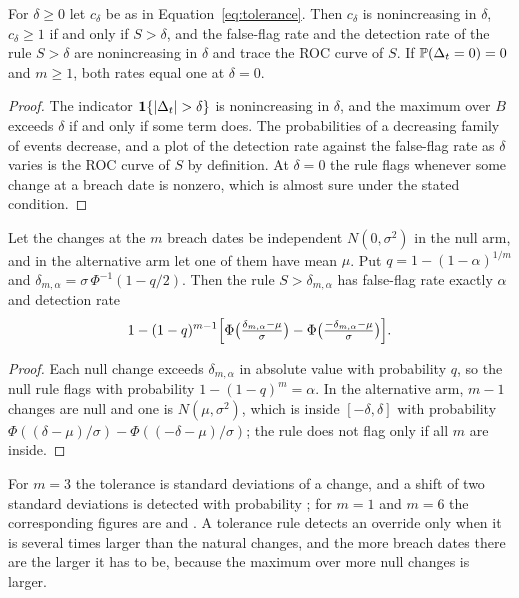 \begin{proposition}
\label{prop:tolerance}
For $\delta\ge 0$ let $c_\delta$ be as in Equation~\eqref{eq:tolerance}. Then $c_\delta$ is nonincreasing in $\delta$, $c_\delta\ge 1$ if and only if $S>\delta$, and the false-flag rate and the detection rate of the rule $S>\delta$ are nonincreasing in $\delta$ and trace the ROC curve of $S$. If $\mathbb{P}(\Delta_t=0)=0$ and $m\ge 1$, both rates equal one at $\delta=0$.
\end{proposition}
\begin{proof}
The indicator $\indic\{|\Delta_t|>\delta\}$ is nonincreasing in $\delta$, and the maximum over $B$ exceeds $\delta$ if and only if some term does. The probabilities of a decreasing family of events decrease, and a plot of the detection rate against the false-flag rate as $\delta$ varies is the ROC curve of $S$ by definition. At $\delta=0$ the rule flags whenever some change at a breach date is nonzero, which is almost sure under the stated condition.
\end{proof}

\begin{proposition}
\label{prop:gaussian}
Let the changes at the $m$ breach dates be independent $N(0,\sigma^2)$ in the null arm, and in the alternative arm let one of them have mean $\mu$. Put $q=1-(1-\alpha)^{1/m}$ and $\delta_{m,\alpha}=\sigma\,\Phi^{-1}(1-q/2)$. Then the rule $S>\delta_{m,\alpha}$ has false-flag rate exactly $\alpha$ and detection rate
\begin{equation}
1-(1-q)^{m-1}\Bigl[\Phi\bigl(\tfrac{\delta_{m,\alpha}-\mu}{\sigma}\bigr)-\Phi\bigl(\tfrac{-\delta_{m,\alpha}-\mu}{\sigma}\bigr)\Bigr].
\label{eq:gaussian-power}
\end{equation}
\end{proposition}
\begin{proof}
Each null change exceeds $\delta_{m,\alpha}$ in absolute value with probability $q$, so the null rule flags with probability $1-(1-q)^m=\alpha$. In the alternative arm, $m-1$ changes are null and one is $N(\mu,\sigma^2)$, which is inside $[-\delta,\delta]$ with probability $\Phi((\delta-\mu)/\sigma)-\Phi((-\delta-\mu)/\sigma)$; the rule does not flag only if all $m$ are inside.
\end{proof}
For $m=3$ the tolerance is \gaussDeltaThree{} standard deviations of a change, and a shift of two standard deviations is detected with probability \gaussPowThree{}; for $m=1$ and $m=6$ the corresponding figures are \gaussPowOne{} and \gaussPowSix{}. A tolerance rule detects an override only when it is several times larger than the natural changes, and the more breach dates there are the larger it has to be, because the maximum over more null changes is larger.

